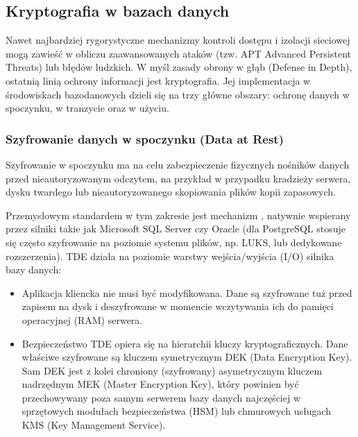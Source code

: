 \documentclass[letterpaper,10pt,polish]{sphinxmanual}
\begin{document}
\sphinxstepscope


\subsection{Kryptografia w bazach danych}
\label{\detokenize{rozdzia_u0142_2/rozdzia_u0142_27/rozdzial_4:kryptografia-w-bazach-danych}}\label{\detokenize{rozdzia_u0142_2/rozdzia_u0142_27/rozdzial_4::doc}}
\sphinxAtStartPar
Nawet najbardziej rygorystyczne mechanizmy kontroli dostępu i izolacji sieciowej mogą zawieść w obliczu zaawansowanych ataków (tzw. APT \textendash{} Advanced Persistent Threats) lub błędów ludzkich. W myśl zasady obrony w głąb (Defense in Depth), ostatnią linią ochrony informacji jest kryptografia. Jej implementacja w środowiskach bazodanowych dzieli się na trzy główne obszary: ochronę danych w spoczynku, w tranzycie oraz w użyciu.


\subsubsection{Szyfrowanie danych w spoczynku (Data at Rest)}
\label{\detokenize{rozdzia_u0142_2/rozdzia_u0142_27/rozdzial_4:szyfrowanie-danych-w-spoczynku-data-at-rest}}
\sphinxAtStartPar
Szyfrowanie w spoczynku ma na celu zabezpieczenie fizycznych nośników danych przed nieautoryzowanym odczytem, na przykład w przypadku kradzieży serwera, dysku twardego lub nieautoryzowanego skopiowania plików kopii zapasowych.

\sphinxAtStartPar
Przemysłowym standardem w tym zakresie jest mechanizm , natywnie wspierany przez silniki takie jak Microsoft SQL Server czy Oracle (dla PostgreSQL stosuje się często szyfrowanie na poziomie systemu plików, np. LUKS, lub dedykowane rozszerzenia). TDE działa na poziomie warstwy wejścia/wyjścia (I/O) silnika bazy danych:
\begin{itemize}
\item {} 
\sphinxAtStartPar
{} Aplikacja kliencka nie musi być modyfikowana. Dane są szyfrowane tuż przed zapisem na dysk i deszyfrowane w momencie wczytywania ich do pamięci operacyjnej (RAM) serwera.

\item {} 
\sphinxAtStartPar
{} Bezpieczeństwo TDE opiera się na hierarchii kluczy kryptograficznych. Dane właściwe szyfrowane są kluczem symetrycznym DEK (Data Encryption Key). Sam DEK jest z kolei chroniony (szyfrowany) asymetrycznym kluczem nadrzędnym MEK (Master Encryption Key), który powinien być przechowywany poza samym serwerem bazy danych \textendash{} najczęściej w sprzętowych modułach bezpieczeństwa (HSM) lub chmurowych usługach KMS (Key Management Service).

\end{itemize}
\end{document}

